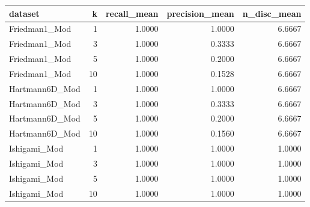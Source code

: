 \begin{tabular}{lrrrr}
\toprule
dataset & k & recall_mean & precision_mean & n_disc_mean \\
\midrule
Friedman1_Mod & 1 & 1.0000 & 1.0000 & 6.6667 \\
Friedman1_Mod & 3 & 1.0000 & 0.3333 & 6.6667 \\
Friedman1_Mod & 5 & 1.0000 & 0.2000 & 6.6667 \\
Friedman1_Mod & 10 & 1.0000 & 0.1528 & 6.6667 \\
Hartmann6D_Mod & 1 & 1.0000 & 1.0000 & 6.6667 \\
Hartmann6D_Mod & 3 & 1.0000 & 0.3333 & 6.6667 \\
Hartmann6D_Mod & 5 & 1.0000 & 0.2000 & 6.6667 \\
Hartmann6D_Mod & 10 & 1.0000 & 0.1560 & 6.6667 \\
Ishigami_Mod & 1 & 1.0000 & 1.0000 & 1.0000 \\
Ishigami_Mod & 3 & 1.0000 & 1.0000 & 1.0000 \\
Ishigami_Mod & 5 & 1.0000 & 1.0000 & 1.0000 \\
Ishigami_Mod & 10 & 1.0000 & 1.0000 & 1.0000 \\
\bottomrule
\end{tabular}
